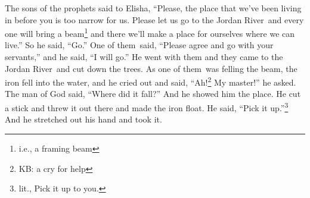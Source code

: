 
\begin{inparaenum}
     The sons of the prophets said to Elisha, ``Please, the place that we've been living in before you is too narrow for us.%
     Please let us go to the Jordan River\understood\ and every one will bring a beam\footnote{i.e., a framing beam} and there we'll make a place for ourselves where we can live.'' So he said, ``Go.''%
     One of them\understood\ said, ``Please agree and go with your servants,'' and he said, ``I will go.''%
     He went with them and they came to the Jordan River\understood\ and cut down the trees.%
     As one of them\understood\ was felling the beam, the iron fell into the water, and he cried out and said, ``Ah!\footnote{KB: a cry for help} My master!'' he asked.%
     The man of God said, ``Where did it fall?'' And he showed him the place. He cut a stick and threw it out there and made the iron float.%
     He said, ``Pick it up.''\footnote{lit., Pick it up to you.} And he stretched out his hand and took it.%
    

\end{inparaenum}
